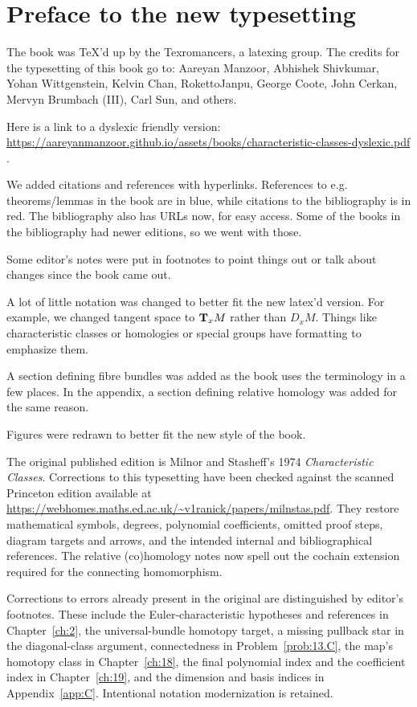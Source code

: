 \documentclass[../main]{subfiles}
\begin{document}
\chapter*{Preface to the new typesetting}

The book was TeX'd up by the Texromancers, a latexing group. The credits for the typesetting of this book go to: Aareyan Manzoor, Abhishek Shivkumar, Yohan Wittgenstein, Kelvin Chan, RokettoJanpu, George Coote, John Cerkan, Mervyn Brumbach (III), Carl Sun, and others.  %

Here is a link to a dyslexic friendly version: \url{https://aareyanmanzoor.github.io/assets/books/characteristic-classes-dyslexic.pdf} .

We added citations and references with hyperlinks. References to e.g. theorems/lemmas in the book are in blue, while citations to the bibliography is
in red. The bibliography also has URLs now, for easy access. Some of the books
in the bibliography had newer editions, so we went with those.

Some editor's notes were put in footnotes to point things out or talk about changes since the book came out.

A lot of little notation was changed to better fit the new latex'd version. For example, we changed tangent space to $\tangentspace{M}{x}$ rather than $D_x M$. Things like characteristic classes or homologies or special groups have formatting to emphasize them.

A section defining fibre bundles was added as the book uses the terminology in a few places. In the appendix, a section defining relative homology was added for the same reason.

Figures were redrawn to better fit the new style of the book.

The original published edition is Milnor and Stasheff's 1974 \emph{Characteristic Classes}. Corrections to this typesetting have been checked against the scanned Princeton edition available at \url{https://webhomes.maths.ed.ac.uk/~v1ranick/papers/milnstas.pdf}. They restore mathematical symbols, degrees, polynomial coefficients, omitted proof steps, diagram targets and arrows, and the intended internal and bibliographical references. The relative (co)homology notes now spell out the cochain extension required for the connecting homomorphism.

Corrections to errors already present in the original are distinguished by editor's footnotes. These include the Euler-characteristic hypotheses and references in Chapter~\ref{ch:2}, the universal-bundle homotopy target, a missing pullback star in the diagonal-class argument, connectedness in Problem~\ref{prob:13.C}, the map's homotopy class in Chapter~\ref{ch:18}, the final polynomial index and the coefficient index in Chapter~\ref{ch:19}, and the dimension and basis indices in Appendix~\ref{app:C}. Intentional notation modernization is retained.
\end{document}
